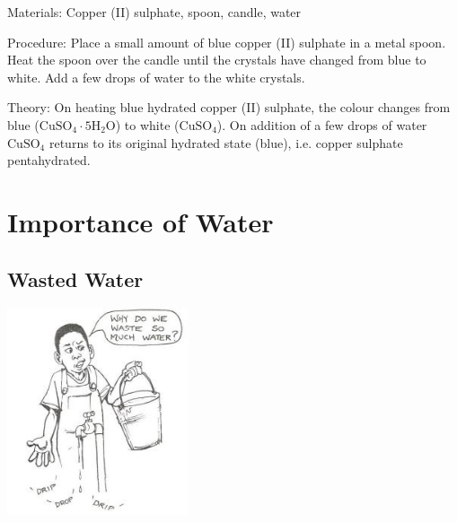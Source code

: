 \begin{multicols}{2}
\begin{description*}
\item[Materials:]{Copper (II) sulphate, spoon, candle, water}
\item[Procedure:]{Place a small amount of blue copper (II) sulphate in a metal spoon. Heat the spoon over the candle until the crystals have changed from blue to white. Add a few drops of water to the white crystals. }
\item[Theory:]{On heating blue hydrated copper (II) sulphate, the colour changes from blue
($\mathrm{Cu}\mathrm{SO}_4\cdot 5\mathrm{H}_2\mathrm{O}$) to white ($\mathrm{Cu}\mathrm{SO}_4$). On addition of a few drops of water $\mathrm{Cu}\mathrm{SO}_4$ returns to its original hydrated state (blue), i.e. copper sulphate pentahydrated.}
\end{description*}


\section*{Importance of Water}


\subsection{Wasted Water}

\begin{center}
\includegraphics[width=0.4\textwidth]{./img/source/water-waste.jpg}
\end{center}


\end{multicols}
